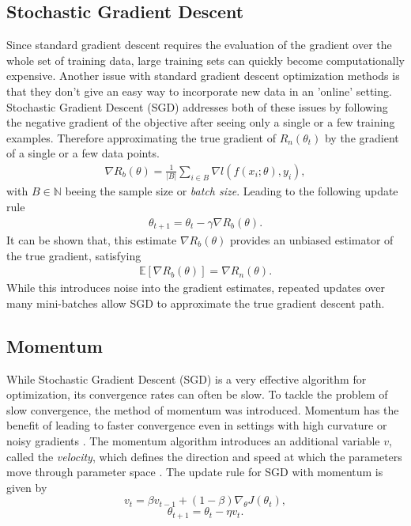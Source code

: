 \subsection{Stochastic Gradient Descent}
\label{sec:sgd}


Since standard gradient descent requires the evaluation of the gradient over the whole set of training data, large training sets can quickly become 
computationally expensive.
Another issue with standard gradient descent optimization methods is that they don’t give an easy way to incorporate new data in an 'online' setting.
 Stochastic Gradient Descent (SGD) addresses both of these issues by following the negative gradient of the objective after seeing only a single or a few training examples.
 Therefore approximating the true gradient of $ R_n(\theta_t)$ by the gradient of a single or a few data points.
\begin{align}
{\nabla} R_b(\theta) = \frac{1}{|B|} \sum_{i \in B} \nabla  l(f(x_i; \theta), y_i),
\end{align}
    with $B \in \mathbb{N}$ beeing the sample size or \emph{batch size}.
 Leading to the following update rule \cite{stanfordSGD}
 \begin{align}
    \theta_{t+1} = \theta_t - \gamma  {\nabla} R_b(\theta).
\end{align}
It can be shown that, this estimate $\nabla R_b(\theta)$ provides an unbiased estimator of the true gradient, satisfying
\begin{align}
\mathbb{E}[{\nabla} R_b(\theta)] = \nabla R_n(\theta).
\end{align}
While this introduces noise into the gradient estimates, repeated updates over many mini-batches allow SGD to approximate the true gradient descent path.
\subsection{Momentum}
\label{sec:momentum}


While Stochastic Gradient Descent (SGD) is a very effective algorithm for optimization,
its convergence rates can often be slow. To tackle the problem of slow convergence,
the method of momentum \cite{polyak1964some} was introduced. Momentum has the benefit of
leading to faster convergence even in settings with high curvature or noisy gradients \cite{Goodfellow-et-al-2016}.
The momentum algorithm introduces an additional variable $v$, called the \emph{velocity},
which defines the direction and speed at which the parameters move through parameter space \cite{Goodfellow-et-al-2016}.
The update rule for SGD with momentum is given by
\[    v_t = \beta v_{t-1} + (1 - \beta) \nabla_{\theta} J(\theta_t), \]
\[     \theta_{t+1} = \theta_t - \eta v_t .\]

